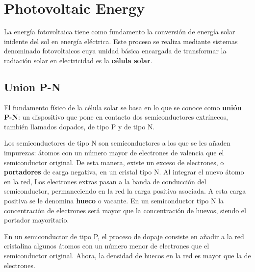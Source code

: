 \section{Photovoltaic Energy}

La energía fotovoltaica tiene como fundamento la conversión de energía solar inidente del sol en energía eléctrica. Este proceso se realiza mediante sistemas denominado fotovoltaicos cuya unidad básica encargada de transformar la radiación solar en electricidad es la \textbf{célula solar}.

\subsection{Union P-N}

El fundamento físico de la célula solar se basa en lo que se conoce como \textbf{unión P-N}: un dispositivo que pone en contacto dos semiconductores extrínecos, también llamados dopados, de tipo P y de tipo N.

Los semiconductores de tipo N son semiconductores a los que se les añaden impurezas: átomos con un número mayor de electrones de valencia que el semiconductor original. De esta manera, existe un exceso de electrones, o \textbf{portadores} de carga negativa, en un cristal tipo N. Al integrar el nuevo átomo en la red, Los electrones extras pasan a la banda de conducción del semiconductor, permaneciendo en la red la carga positiva asociada. A esta carga positiva se le denomina \textbf{hueco} o vacante. En un semiconductor tipo N la concentración de electrones será mayor que la concentración de huevos, siendo el portador mayoritario.

En un semiconductor de tipo P, el proceso de dopaje consiste en añadir a la red cristalina algunos átomos con un número menor de electrones que el semiconductor original. Ahora, la densidad de huecos en la red es mayor que la de electrones. 


